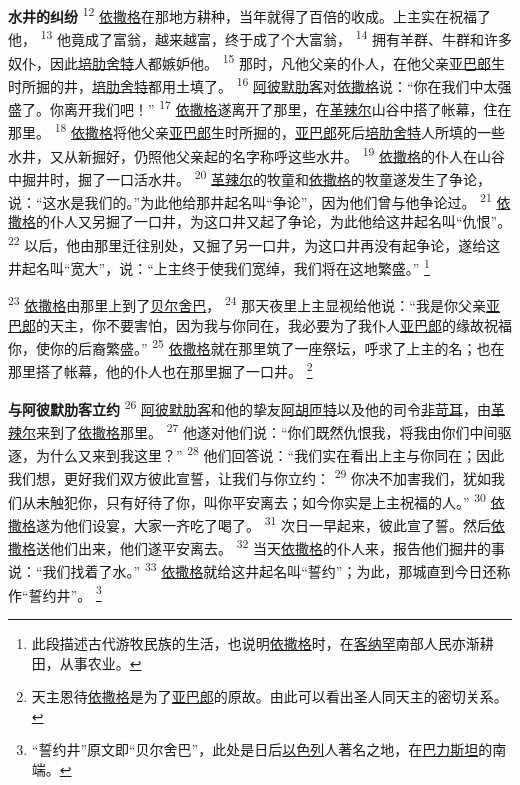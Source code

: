 \textbf{水井的纠纷 }
\textsuperscript{12}
\uline{依撒格}在那地方耕种，当年就得了百倍的收成。上主实在祝福了他，
\textsuperscript{13}
他竟成了富翁，越来越富，终于成了个大富翁，
\textsuperscript{14}
拥有羊群、牛群和许多奴仆，因此\uline{培肋}\uline{舍特}人都嫉妒他。
\textsuperscript{15}
那时，凡他父亲的仆人，在他父亲\uline{亚巴郎}生时所掘的井，\uline{培肋}\uline{舍特}都用土填了。
\textsuperscript{16}
\uline{阿彼默}\uline{肋客}对\uline{依撒格}说：“你在我们中太强盛了。你离开我们吧！”
\textsuperscript{17}
\uline{依撒格}遂离开了那里，在\uline{革辣尔}山谷中搭了帐幕，住在那里。
\textsuperscript{18}
\uline{依撒格}将他父亲\uline{亚巴郎}生时所掘的，\uline{亚巴郎}死后\uline{培肋}\uline{舍特}人所填的一些水井，又从新掘好，仍照他父亲起的名字称呼这些水井。
\textsuperscript{19}
\uline{依撒格}的仆人在山谷中掘井时，掘了一口活水井。
\textsuperscript{20}
\uline{革辣尔}的牧童和\uline{依撒格}的牧童遂发生了争论，说：“这水是我们的。”为此他给那井起名叫“争论”，因为他们曾与他争论过。
\textsuperscript{21}
\uline{依撒格}的仆人又另掘了一口井，为这口井又起了争论，为此他给这井起名叫“仇恨”。
\textsuperscript{22}
以后，他由那里迁往别处，又掘了另一口井，为这口井再没有起争论，遂给这井起名叫“宽大”，说：“上主终于使我们宽绰，我们将在这地繁盛。”
\footnote{此段描述古代游牧民族的生活，也说明\uline{依撒格}时，在\uline{客纳罕}南部人民亦渐耕田，从事农业。}

\textsuperscript{23}
\uline{依撒格}由那里上到了\uline{贝尔}\uline{舍巴}，
\textsuperscript{24}
那天夜里上主显视给他说：“我是你父亲\uline{亚巴郎}的天主，你不要害怕，因为我与你同在，我必要为了我仆人\uline{亚巴郎}的缘故祝福你，使你的后裔繁盛。”
\textsuperscript{25}
\uline{依撒格}就在那里筑了一座祭坛，呼求了上主的名；也在那里搭了帐幕，他的仆人也在那里掘了一口井。
\footnote{天主恩待\uline{依撒格}是为了\uline{亚巴郎}的原故。由此可以看出圣人同天主的密切关系。}

\textbf{与阿彼默肋客立约 }
\textsuperscript{26}
\uline{阿彼默}\uline{肋客}和他的挚友\uline{阿胡}\uline{匝特}以及他的司令\uline{非苛耳}，由\uline{革辣尔}来到了\uline{依撒格}那里。
\textsuperscript{27}
他遂对他们说：“你们既然仇恨我，将我由你们中间驱逐，为什么又来到我这里？”
\textsuperscript{28}
他们回答说：“我们实在看出上主与你同在；因此我们想，更好我们双方彼此宣誓，让我们与你立约：
\textsuperscript{29}
你决不加害我们，犹如我们从未触犯你，只有好待了你，叫你平安离去；如今你实是上主祝福的人。”
\textsuperscript{30}
\uline{依撒格}遂为他们设宴，大家一齐吃了喝了。
\textsuperscript{31}
次日一早起来，彼此宣了誓。然后\uline{依撒格}送他们出来，他们遂平安离去。
\textsuperscript{32}
当天\uline{依撒格}的仆人来，报告他们掘井的事说：“我们找着了水。”
\textsuperscript{33}
\uline{依撒格}就给这井起名叫“誓约”；为此，那城直到今日还称作“誓约井”。
\footnote{“誓约井”原文即“贝尔舍巴”，此处是日后\uline{以色列}人著名之地，在\uline{巴力斯坦}的南端。}

